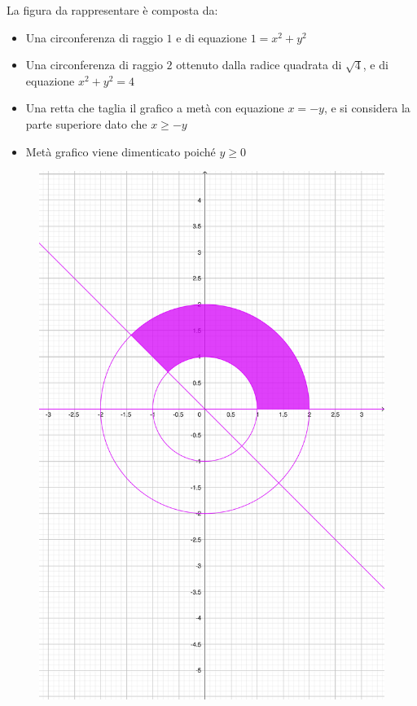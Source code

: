 \documentclass[a4paper]{article}
\begin{document}
	\noindent
	La figura da rappresentare è composta da:
	\begin{itemize}
		\item Una circonferenza di raggio $1$ e di equazione $1 = x^{2}+y^{2}$
		\item Una circonferenza di raggio $2$ ottenuto dalla radice quadrata di $\sqrt{4}$, e di equazione $x^{2}+y^{2} = 4$
		\item Una retta che taglia il grafico a metà con equazione $x = -y$, e si considera la parte superiore dato che $x \ge -y$
		\item Metà grafico viene dimenticato poiché $y \ge 0$
	\end{itemize}
	\begin{figure}[!htp]
		\centering
		\includegraphics[width=.7\textwidth]{img/exercise/2023-06-21-A-ex6.pdf}
	\end{figure}
\end{document}
